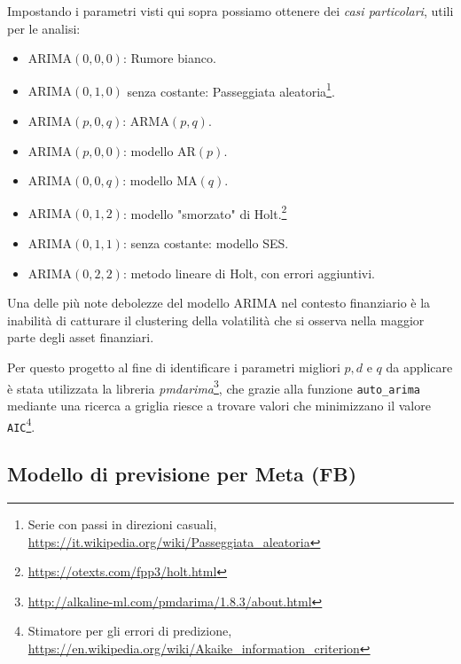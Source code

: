 Impostando i parametri visti qui sopra possiamo ottenere dei \emph{casi particolari}, utili per le analisi:

\begin{itemize}
    \item \(\text{ARIMA} (0,0,0)\): Rumore bianco.
    \item \(\text{ARIMA} (0,1,0)\) senza costante: Passeggiata 
    aleatoria\footnote{
        Serie con passi in direzioni casuali, \href{https://it.wikipedia.org/wiki/Passeggiata_aleatoria}{https://it.wikipedia.org/wiki/Passeggiata\_aleatoria}
    }.
    \item \(\text{ARIMA} (p,0,q)\): \(\text{ARMA} (p,q)\).
    \item \(\text{ARIMA} (p,0,0)\): modello \(\text{AR} (p)\).
    \item \(\text{ARIMA} (0,0,q)\): modello \(\text{MA} (q)\).
    \item \(\text{ARIMA} (0,1,2)\): modello "smorzato" di 
    Holt.\footnote{
        \href{https://otexts.com/fpp3/holt.html}{https://otexts.com/fpp3/holt.html}
    }
    \item \(\text{ARIMA} (0,1,1)\): senza costante: modello SES.
    \item \(\text{ARIMA} (0,2,2)\): metodo lineare di Holt\footnotemark[28], con errori aggiuntivi.
\end{itemize}

Una delle più note debolezze del modello ARIMA nel contesto finanziario è la inabilità di catturare il clustering della volatilità
che si osserva nella maggior parte degli asset finanziari.

Per questo progetto al fine di identificare i parametri migliori \(p, d \text{ e } q \) da applicare è stata utilizzata la libreria 
\emph{pmdarima}\footnote{
    \href{http://alkaline-ml.com/pmdarima/1.8.3/about.html}{http://alkaline-ml.com/pmdarima/1.8.3/about.html}
}, che grazie alla funzione \verb|auto_arima| mediante una ricerca a griglia riesce a trovare valori che minimizzano il valore 
\verb|AIC|\footnote{
    Stimatore per gli errori di predizione, \href{https://en.wikipedia.org/wiki/Akaike_information_criterion}{https://en.wikipedia.org/wiki/Akaike\_information\_criterion}
}.

\subsection{Modello di previsione per Meta (FB)}